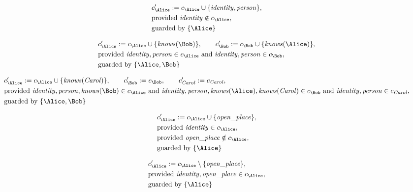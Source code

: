 \begin{align*}
&
c'_
{
\Alice
}
 := 
c_
{
\Alice
}
 \cup 
\{
\mathit{\detokenize{
identity
}}
,
\mathit{\detokenize{
person
}}
\}
,\\
&
\text{provided } 
\mathit{\detokenize{
identity
}}
 \notin c_
{
\Alice
}
,\\
&
\text{guarded by } \{
\Alice
\}
\end{align*}

\begin{align*}
&
c'_
{
\Alice
}
 := 
c_
{
\Alice
}
 \cup 
\{
\mathit{\detokenize{
knows
}}
(
\Bob
)
\}
, \qquad 
c'_
{
\Bob
}
 := 
c_
{
\Bob
}
 \cup 
\{
\mathit{\detokenize{
knows
}}
(
\Alice
)
\}
,\\
&
\text{provided } 
\mathit{\detokenize{
identity
}}
,
\mathit{\detokenize{
person
}}
 \in c_
{
\Alice
}
 \text{ and } 
\mathit{\detokenize{
identity
}}
,
\mathit{\detokenize{
person
}}
 \in c_
{
\Bob
}
,\\
&
\text{guarded by } \{
\Alice
,
\Bob
\}
\end{align*}

\begin{align*}
&
c'_
{
\Alice
}
 := 
c_
{
\Alice
}
 \cup 
\{
\mathit{\detokenize{
knows
}}
(
\mathit{Carol}
)
\}
, \qquad 
c'_
{
\Bob
}
 := 
c_
{
\Bob
}
, \qquad 
c'_
{
\mathit{Carol}
}
 := 
c_
{
\mathit{Carol}
}
,\\
&
\text{provided } 
\mathit{\detokenize{
identity
}}
,
\mathit{\detokenize{
person
}}
,
\mathit{\detokenize{
knows
}}
(
\Bob
)
 \in c_
{
\Alice
}
 \text{ and } 
\mathit{\detokenize{
identity
}}
,
\mathit{\detokenize{
person
}}
,
\mathit{\detokenize{
knows
}}
(
\Alice
)
,
\mathit{\detokenize{
knows
}}
(
\mathit{Carol}
)
 \in c_
{
\Bob
}
 \text{ and } 
\mathit{\detokenize{
identity
}}
,
\mathit{\detokenize{
person
}}
 \in c_
{
\mathit{Carol}
}
,\\
&
\text{guarded by } \{
\Alice
,
\Bob
\}
\end{align*}

\begin{align*}
&
c'_
{
\Alice
}
 := 
c_
{
\Alice
}
 \cup 
\{
\mathit{\detokenize{
open_place
}}
\}
,\\
&
\text{provided } 
\mathit{\detokenize{
identity
}}
 \in c_
{
\Alice
}
,\\
&
\text{provided } 
\mathit{\detokenize{
open_place
}}
 \notin c_
{
\Alice
}
,\\
&
\text{guarded by } \{
\Alice
\}
\end{align*}

\begin{align*}
&
c'_
{
\Alice
}
 := 
c_
{
\Alice
}
 \setminus 
\{
\mathit{\detokenize{
open_place
}}
\}
,\\
&
\text{provided } 
\mathit{\detokenize{
identity
}}
,
\mathit{\detokenize{
open_place
}}
 \in c_
{
\Alice
}
,\\
&
\text{guarded by } \{
\Alice
\}
\end{align*}
